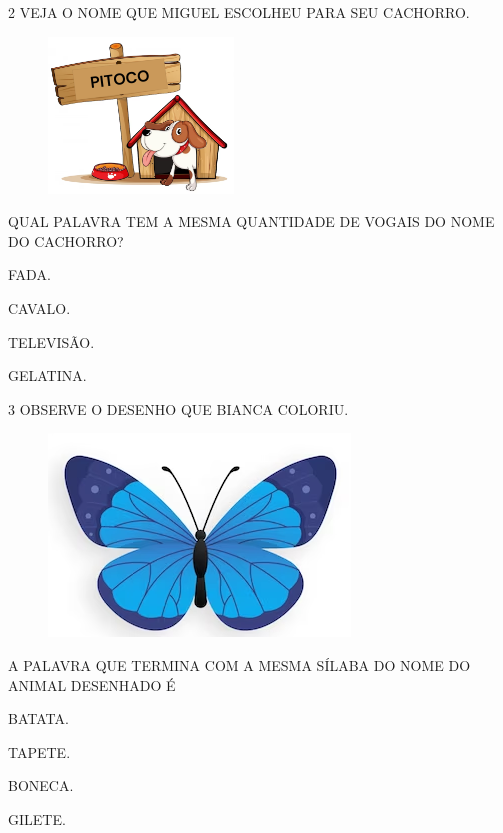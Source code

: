 \num{2} VEJA O NOME QUE MIGUEL ESCOLHEU PARA SEU CACHORRO. 

\begin{figure}[htpb]
\centering
\includegraphics[width=.5\textwidth]{media/image226.png}
\end{figure}

QUAL PALAVRA TEM A MESMA QUANTIDADE DE VOGAIS DO NOME DO CACHORRO?

\begin{escolha}
\item FADA.

\item CAVALO.

\item TELEVISÃO.

\item GELATINA.
\end{escolha}

\num{3} OBSERVE O DESENHO QUE BIANCA COLORIU.

\begin{figure}[htpb]
\centering
\includegraphics[width=.5\textwidth]{media/image227.png}
\end{figure}


A PALAVRA QUE TERMINA COM A MESMA SÍLABA DO NOME DO ANIMAL DESENHADO É

\begin{escolha}
\item BATATA.

\item TAPETE.

\item BONECA.

\item GILETE.
\end{escolha}

